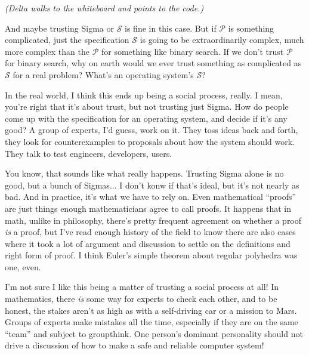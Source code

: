 \documentclass[sigplan]{acmart}
\begin{document}
\vspace{0.1in}

\emph{(Delta walks to the whiteboard and points to the code.)}

\vspace{0.1in}

  And maybe trusting Sigma or $\mathcal{S}$
is fine in this case.  But if $\mathcal{P}$ is something complicated,
just the specification $\mathcal{S}$ is going to be extraordinarily
complex, much more complex than the $\mathcal{P}$ for something like
binary search.  If we don't trust $\mathcal{P}$ for binary search, why
on earth would we ever trust something as complicated as $\mathcal{S}$
for a real problem?  What's an operating system's $\mathcal{S}$?

  In the real world, I think this ends up
being a social process, really.  I mean, you're right that it's about
trust, but not trusting just Sigma.  How do people come up with the
specification for an operating system, and decide if it's any good?  A
group of experts, I'd guess, work on it.  They toss ideas back and
forth, they look for counterexamples to proposals about how the system
should work.  They talk to test engineers, developers, users.

 You know, that sounds like what really
happens.  Trusting Sigma alone is no good, but a bunch of Sigmas...  I
don't konw if that's ideal, but it's not nearly as bad.  And in
practice, it's what we have to rely on.  Even mathematical ``proofs''
are just things enough mathematicians agree to call proofs.  It
happens that in math, unlike in philosophy, there's pretty frequent
agreement on whether a proof \emph{is} a proof, but I've read enough
history of the field to know there are also cases where it took a lot
of argument and discussion to settle on the definitions and right form
of proof.  I think Euler's simple theorem about regular polyhedra was
one, even.

  I'm not sure I like this being a matter
of trusting a social process at all!  In mathematics, there \emph{is}
some way for experts to check each other, and to be honest, the stakes
aren't as high as with a self-driving car or a mission to Mars.
Groups of experts make mistakes all the time, especially if they are
on the same ``team'' and subject to groupthink.  One person's dominant
personality should not drive a discussion of how to make a safe and
reliable computer system!
\end{document}
